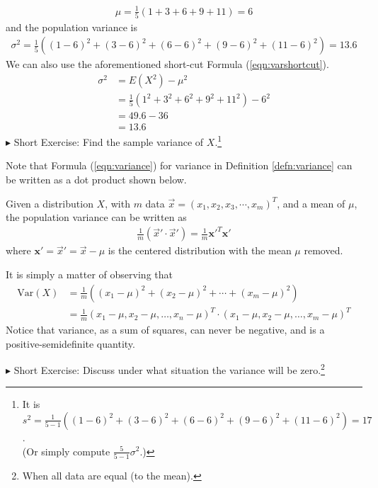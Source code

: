 \begin{align*}
\mu = \frac{1}{5}(1 + 3 + 6 + 9 + 11) = 6
\end{align*}
and the population variance is
\begin{align*}
\sigma^2 = \frac{1}{5}((1-6)^2 + (3-6)^2 + (6-6)^2 + (9-6)^2 + (11-6)^2) = 13.6
\end{align*}
We can also use the aforementioned short-cut Formula (\ref{eqn:varshortcut}).
\begin{align*}
\sigma^2 &= E(X^2) - \mu^2 \\
&= \frac{1}{5} (1^2 + 3^2 + 6^2 + 9^2 + 11^2) - 6^2 \\
&= 49.6 - 36 \\
&= 13.6
\end{align*}
$\blacktriangleright$ Short Exercise: Find the sample variance of $X$.\footnote{It is $s^2 = \frac{1}{5-1}((1-6)^2 + (3-6)^2 + (6-6)^2 + (9-6)^2 + (11-6)^2) = 17$.\\(Or simply compute $\frac{5}{5-1}\sigma^2$.)} \par
Note that Formula (\ref{eqn:variance}) for variance in Definition \ref{defn:variance} can be written as a dot product shown below.
\begin{proper}
Given a distribution $X$, with $m$ data $\vec{x} = (x_1, x_2, x_3, \cdots, x_m)^T$, and a mean of $\mu$, the population variance can be written as
\begin{align}
\frac{1}{m} (\vec{x}'\cdot\vec{x}') = \frac{1}{m} \textbf{x}'^T \textbf{x}'
\end{align}
where $\textbf{x}' = \vec{x}' = \vec{x} - \mu$ is the centered distribution with the mean $\mu$ removed.
\end{proper}
It is simply a matter of observing that 
\begin{align*}
\text{Var}(X) &= \frac{1}{m} ((x_1 - \mu)^2 + (x_2 - \mu)^2 + \cdots + (x_m - \mu)^2) \\ &= \frac{1}{m} (x_1 - \mu, x_2 - \mu, \ldots, x_n - \mu)^T \cdot (x_1 - \mu, x_2 - \mu, \ldots, x_m - \mu)^T    
\end{align*}
Notice that variance, as a sum of squares, can never be negative, and is a positive-semidefinite quantity. \par
$\blacktriangleright$ Short Exercise: Discuss under what situation the variance will be zero.\footnote{When all data are equal (to the mean).}

